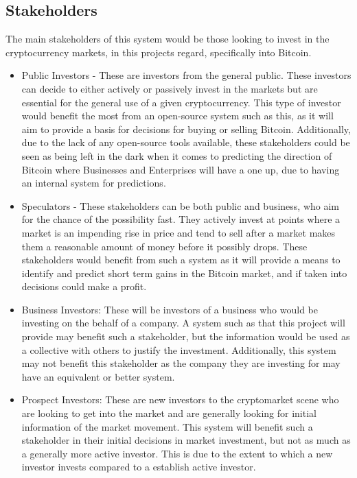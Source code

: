 \documentclass[oneside, 12pt]{article}
\begin{document}
		\subsection{Stakeholders}\label{stakeholders}
		The main stakeholders of this system would be those looking to invest in the cryptocurrency markets, in this projects regard, specifically into Bitcoin. 
		
		\begin{itemize}
			\item Public Investors - These are investors from the general public. These investors can decide to either actively or passively invest in the markets but are essential for the general use of a given cryptocurrency. This type of investor would benefit the most from an open-source system such as this, as it will aim to provide a basis for decisions for buying or selling Bitcoin. Additionally, due to the lack of any open-source tools available, these stakeholders could be seen as being left in the dark when it comes to predicting the direction of Bitcoin where Businesses and Enterprises will have a one up, due to having an internal system for predictions.
			\item Speculators - These stakeholders can be both public and business, who aim for the chance of the possibility fast. They actively invest at points where a market is an impending rise in price and tend to sell after a market makes them a reasonable amount of money before it possibly drops. These stakeholders would benefit from such a system as it will provide a means to identify and predict short term gains in the Bitcoin market, and if taken into decisions could make a profit.
			\item Business Investors: These will be investors of a business who would be investing on the behalf of a company. A system such as that this project will provide may benefit such a stakeholder, but the information would be used as a collective with others to justify the investment. Additionally, this system may not benefit this stakeholder as the company they are investing for may have an equivalent or better system.
			\item Prospect Investors: These are new investors to the cryptomarket scene who are looking to get into the market and are generally looking for initial information of the market movement. This system will benefit such a stakeholder in their initial decisions in market investment, but not as much as a generally more active investor. This is due to the extent to which a new investor invests compared to a establish active investor.
			

\end{itemize}
\end{document}
